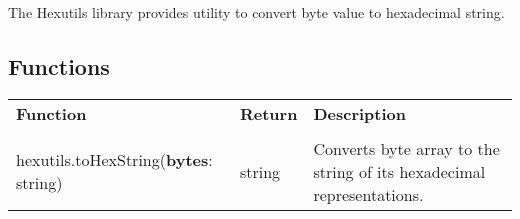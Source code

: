 The Hexutils library provides utility to convert byte value to hexadecimal string.

\subsection{Functions}

\begin{tabularx}{\textwidth}{l l X}
	\textbf{\large Function} & \textbf{\large Return} & \textbf{\large Description}
	\\ \\
	\endhead
	hexutils.toHexString(\textbf{bytes}: string) & string & Converts byte array to the string of its hexadecimal representations.
\end{tabularx}